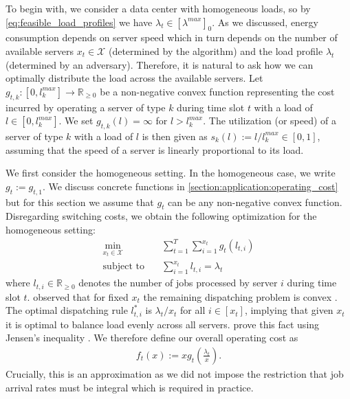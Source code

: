 To begin with, we consider a data center with homogeneous loads, so by \autoref{eq:feasible_load_profiles} we have $\lambda_t \in [\lambda^{max}]_0$. As we discussed, energy consumption depends on server speed which in turn depends on the number of available servers $x_t \in \mathcal{X}$ (determined by the algorithm) and the load profile $\lambda_t$ (determined by an adversary). Therefore, it is natural to ask how we can optimally distribute the load across the available servers. Let $g_{t,k} : [0,l_k^{max}] \to \mathbb{R}_{\geq 0}$ be a non-negative convex function representing the cost incurred by operating a server of type $k$ during time slot $t$ with a load of $l \in [0,l_k^{max}]$. We set $g_{t,k}(l) = \infty$ for $l > l_k^{max}$. The utilization (or speed) of a server of type $k$ with a load of $l$ is then given as $s_k(l) := l / l_k^{max} \in [0,1]$, assuming that the speed of a server is linearly proportional to its load.

We first consider the homogeneous setting. In the homogeneous case, we write $g_t := g_{t,1}$. We discuss concrete functions in \autoref{section:application:operating_cost} but for this section we assume that $g_t$ can be any non-negative convex function. Disregarding switching costs, we obtain the following optimization for the homogeneous setting: \begin{align*}
    \min_{x_t \in \mathcal{X}} \quad &\sum_{t=1}^T \sum_{i=1}^{x_t} g_t(l_{t,i}) \\
    \text{subject to}        \quad &\sum_{i=1}^{x_t} l_{t,i} = \lambda_t
\end{align*} where $l_{t,i} \in \mathbb{R}_{\geq 0}$ denotes the number of jobs processed by server $i$ during time slot $t$. \citeauthor*{Lin2011} observed that for fixed $x_t$ the remaining dispatching problem is convex \cite{Lin2011}. The optimal dispatching rule $l_{t,i}^*$ is $\lambda_t / x_t$ for all $i \in [x_t]$, implying that given $x_t$ it is optimal to balance load evenly across all servers. \citeauthor*{Albers2021_2} prove this fact using Jensen's inequality \cite{Albers2021_2}. We therefore define our overall operating cost as \begin{align}\label{eq:homogeneous_load_balancing}
    f_t(x) := x g_t\left(\frac{\lambda_t}{x}\right).
\end{align} Crucially, this is an approximation as we did not impose the restriction that job arrival rates must be integral which is required in practice.

